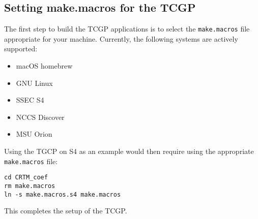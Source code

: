 \subsection{Setting make.macros for the TCGP}
The first step to build the TCGP applications is to select the \verb|make.macros| file appropriate for your machine.
Currently, the following systems are actively supported:
\begin{itemize}
  \item macOS homebrew
  \item GNU Linux
  \item SSEC S4
  \item NCCS Discover
  \item MSU Orion
\end{itemize}

Using the TGCP on S4 as an example would then require using the appropriate \verb|make.macros| file:
\begin{verbatim}
cd CRTM_coef
rm make.macros
ln -s make.macros.s4 make.macros 
\end{verbatim}
This completes the setup of the TCGP.